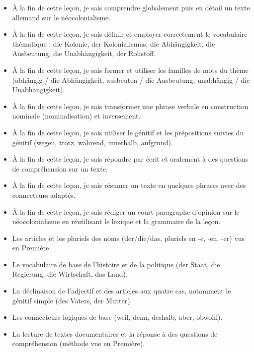 \documentclass[11pt]{article}
\begin{document}
\begin{objectifs}
\begin{itemize}
\item À la fin de cette leçon, je sais comprendre globalement puis en détail un texte allemand sur le néocolonialisme.
\item À la fin de cette leçon, je sais définir et employer correctement le vocabulaire thématique : die Kolonie, der Kolonialismus, die Abhängigkeit, die Ausbeutung, die Unabhängigkeit, der Rohstoff.
\item À la fin de cette leçon, je sais former et utiliser les familles de mots du thème (abhängig / die Abhängigkeit, ausbeuten / die Ausbeutung, unabhängig / die Unabhängigkeit).
\item À la fin de cette leçon, je sais transformer une phrase verbale en construction nominale (nominalisation) et inversement.
\item À la fin de cette leçon, je sais utiliser le génitif et les prépositions suivies du génitif (wegen, trotz, während, innerhalb, aufgrund).
\item À la fin de cette leçon, je sais répondre par écrit et oralement à des questions de compréhension sur un texte.
\item À la fin de cette leçon, je sais résumer un texte en quelques phrases avec des connecteurs adaptés.
\item À la fin de cette leçon, je sais rédiger un court paragraphe d'opinion sur le néocolonialisme en réutilisant le lexique et la grammaire de la leçon.
\end{itemize}
\end{objectifs}

\begin{prerequis}
\begin{itemize}
\item Les articles et les pluriels des noms (der/die/das, pluriels en -e, -en, -er) vus en Première.
\item Le vocabulaire de base de l'histoire et de la politique (der Staat, die Regierung, die Wirtschaft, das Land).
\item La déclinaison de l'adjectif et des articles aux quatre cas, notamment le génitif simple (des Vaters, der Mutter).
\item Les connecteurs logiques de base (weil, denn, deshalb, aber, obwohl).
\item La lecture de textes documentaires et la réponse à des questions de compréhension (méthode vue en Première).
\end{itemize}
\end{prerequis}
\end{document}
